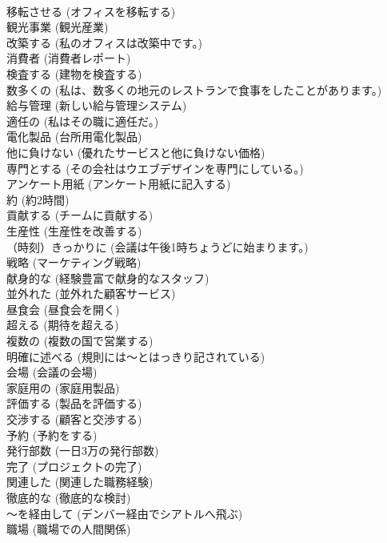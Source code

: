 \documentclass[8pt]{extreport}
\begin{document}
\begin{CJK}{UTF8}{min}
\\	移転させる	(オフィスを移転する)		
\\	観光事業	(観光産業)		
\\	改築する	(私のオフィスは改築中です。)		
\\	消費者	(消費者レポート)		
\\	検査する	(建物を検査する)		
\\	数多くの	(私は、数多くの地元のレストランで食事をしたことがあります。)		
\\	給与管理	(新しい給与管理システム)		
\\	適任の	(私はその職に適任だ。)		
\\	電化製品	(台所用電化製品)		
\\	他に負けない	(優れたサービスと他に負けない価格)		
\\	専門とする	(その会社はウエブデザインを専門にしている。)		
\\	アンケート用紙	(アンケート用紙に記入する)		
\\	約	(約2時間)		
\\	貢献する	(チームに貢献する)		
\\	生産性	(生産性を改善する)		
\\	（時刻）きっかりに	(会議は午後1時ちょうどに始まります。)		
\\	戦略	(マーケティング戦略)		
\\	献身的な	(経験豊富で献身的なスタッフ)		
\\	並外れた	(並外れた顧客サービス)		
\\	昼食会	(昼食会を開く)		
\\	超える	(期待を超える)		
\\	複数の	(複数の国で営業する)		
\\	明確に述べる	(規則には～とはっきり記されている)		
\\	会場	(会議の会場)		
\\	家庭用の	(家庭用製品)		
\\	評価する	(製品を評価する)		
\\	交渉する	(顧客と交渉する)		
\\	予約	(予約をする)		
\\	発行部数	(一日3万の発行部数)		
\\	完了	(プロジェクトの完了)		
\\	関連した	(関連した職務経験)		
\\	徹底的な	(徹底的な検討)		
\\	～を経由して	(デンバー経由でシアトルへ飛ぶ)		
\\	職場	(職場での人間関係)		

\end{CJK}
\end{document}
